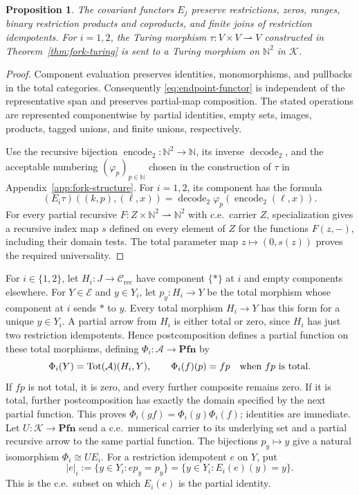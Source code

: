 \documentclass[11pt]{article}
\newtheorem{proposition}[theorem]{Proposition}
\newcommand{\N}{\mathbb N}
\newcommand{\Pfn}{\mathbf{Pfn}}
\begin{document}
\begin{proposition}\label{prop:endpoint}
The covariant functors $E_j$ preserve restrictions, zeros, ranges,
binary restriction products and coproducts, and finite joins of
restriction idempotents.
For $i=1,2$, the Turing morphism
$\tau:V\times V\rightharpoonup V$ constructed in
Theorem~\ref{thm:fork-turing} is sent
to a Turing morphism on $\N^2$ in $\mathcal K$.
\end{proposition}
\begin{proof}
Component evaluation preserves identities, monomorphisms, and
pullbacks in the total categories. Consequently \eqref{eq:endpoint-functor}
is independent of the representative span and preserves partial-map
composition. The stated operations are represented componentwise by
partial identities, empty sets, images, products, tagged unions, and
finite unions, respectively.

Use the recursive bijection $\operatorname{encode}_2:\N^2\to\N$,
its inverse $\operatorname{decode}_2$, and the acceptable numbering
$(\varphi_p)_{p\in\N}$ chosen in the construction of $\tau$ in
Appendix~\ref{app:fork-structure}. For $i=1,2$, its component has
the formula
\[
 (E_i\tau)((k,p),(\ell,x))
 =\operatorname{decode}_2\varphi_p(\operatorname{encode}_2(\ell,x)).
\]
For every partial recursive
$F:Z\times\N^2\rightharpoonup\N^2$ with c.e.\ carrier $Z$,
specialization gives a recursive index map $s$ defined on every
element of $Z$ for
the functions $F(z,-)$, including their domain tests.
The total parameter map $z\mapsto(0,s(z))$ proves the required
universality.
\end{proof}

For $i\in\{1,2\}$, let $H_i:J\to\mathcal C_{\mathrm{rec}}$
have component $\{*\}$ at $i$ and empty components elsewhere.
For $Y\in\mathcal E$ and $y\in Y_i$, let $p_y:H_i\to Y$ be the total morphism
whose component at $i$ sends $*$ to $y$. Every total morphism
$H_i\to Y$ has this form for a unique $y\in Y_i$. A partial
arrow from $H_i$ is either total or zero, since $H_i$ has just
two restriction idempotents. Hence postcomposition defines a partial
function on these total morphisms, defining
$\Phi_i:\mathcal A\to\Pfn$ by
\[
 \Phi_i(Y)=\operatorname{Tot}(\mathcal A)(H_i,Y),\qquad
 \Phi_i(f)(p)=fp\quad\hbox{when }fp\hbox{ is total}.
\]
If $fp$ is not total, it is zero, and every further composite
remains zero. If it is total, further postcomposition has exactly
the domain specified by the next partial function. This proves
$\Phi_i(gf)=\Phi_i(g)\Phi_i(f)$; identities are immediate.
Let $U:\mathcal K\to\Pfn$ send a c.e.\ numerical carrier to its
underlying set and a partial recursive arrow to the same partial
function. The bijections $p_y\mapsto y$ give a natural isomorphism
$\Phi_i\cong U E_i$.
For a restriction idempotent $e$ on $Y$, put
\begin{equation}\label{eq:probe-domain}
 |e|_i:=\{y\in Y_i:ep_y=p_y\}
       =\{y\in Y_i:E_i(e)(y)=y\}.
\end{equation}
This is the c.e.\ subset on which $E_i(e)$ is the partial identity.
\end{document}
